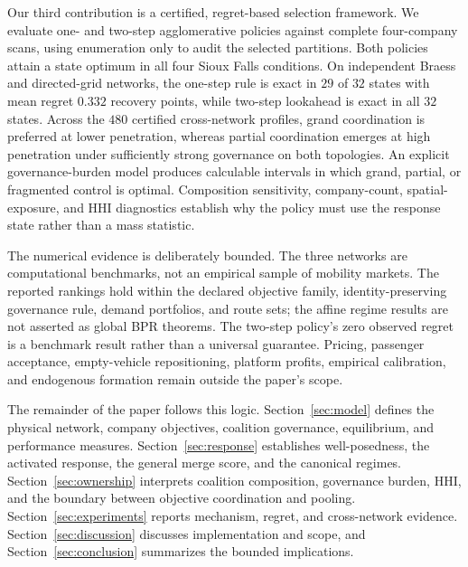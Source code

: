 Our third contribution is a certified, regret-based selection framework. We
evaluate one- and two-step agglomerative policies against complete
four-company scans, using enumeration only to audit the selected partitions.
Both policies attain a state optimum in all four Sioux Falls conditions. On
independent Braess and directed-grid networks, the one-step rule is exact in
$29$ of $32$ states with mean regret $0.332$ recovery points, while two-step
lookahead is exact in all $32$ states. Across the $480$ certified
cross-network profiles, grand coordination is preferred at lower penetration,
whereas partial coordination emerges at high penetration under sufficiently
strong governance on both topologies. An explicit governance-burden model
produces calculable intervals in which grand, partial, or fragmented control is
optimal. Composition sensitivity, company-count, spatial-exposure, and HHI
diagnostics establish why the policy must use the response state rather than a
mass statistic.

The numerical evidence is deliberately bounded. The three networks are
computational benchmarks, not an empirical sample of mobility markets. The
reported rankings hold within the declared objective family,
identity-preserving governance rule, demand portfolios, and route sets; the
affine regime results are not asserted as global BPR theorems. The two-step
policy's zero observed regret is a benchmark result rather than a universal
guarantee. Pricing, passenger acceptance, empty-vehicle repositioning,
platform profits, empirical calibration, and endogenous formation remain
outside the paper's scope.

The remainder of the paper follows this logic. Section~\ref{sec:model} defines
the physical network, company objectives, coalition governance, equilibrium,
and performance measures. Section~\ref{sec:response} establishes
well-posedness, the activated response, the general merge score, and the
canonical regimes. Section~\ref{sec:ownership} interprets coalition
composition, governance burden, HHI, and the boundary between objective
coordination and pooling. Section~\ref{sec:experiments} reports mechanism,
regret, and cross-network evidence. Section~\ref{sec:discussion} discusses
implementation and scope, and Section~\ref{sec:conclusion} summarizes the
bounded implications.
